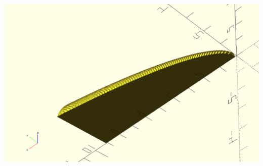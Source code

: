\documentclass[letterpaper]{article}
\begin{document}
\begin{center}
\includegraphics[width=.9\linewidth]{KBe21math401retCrossSectionSolidFinalB3.png}
\end{center}
\end{document}
